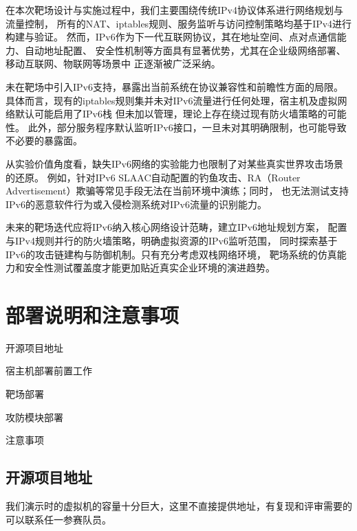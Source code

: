 \documentclass[lang=cn,10pt]{elegantbook}
\begin{document}
在本次靶场设计与实施过程中，我们主要围绕传统IPv4协议体系进行网络规划与流量控制，
所有的NAT、iptables规则、服务监听与访问控制策略均基于IPv4进行构建与验证。
然而，IPv6作为下一代互联网协议，其在地址空间、点对点通信能力、自动地址配置、
安全性机制等方面具有显著优势，尤其在企业级网络部署、移动互联网、物联网等场景中
正逐渐被广泛采纳。

未在靶场中引入IPv6支持，暴露出当前系统在协议兼容性和前瞻性方面的局限。
具体而言，现有的iptables规则集并未对IPv6流量进行任何处理，宿主机及虚拟网络默认可能启用了IPv6栈
但未加以管理，理论上存在绕过现有防火墙策略的可能性。
此外，部分服务程序默认监听IPv6接口，一旦未对其明确限制，也可能导致不必要的暴露面。

从实验价值角度看，缺失IPv6网络的实验能力也限制了对某些真实世界攻击场景的还原。
例如，针对IPv6 SLAAC自动配置的钓鱼攻击、RA（Router Advertisement）欺骗等常见手段无法在当前环境中演练；同时，
也无法测试支持IPv6的恶意软件行为或入侵检测系统对IPv6流量的识别能力。

未来的靶场迭代应将IPv6纳入核心网络设计范畴，建立IPv6地址规划方案，
配置与IPv4规则并行的防火墙策略，明确虚拟资源的IPv6监听范围，
同时探索基于IPv6的攻击链建构与防御机制。只有充分考虑双栈网络环境，
靶场系统的仿真能力和安全性测试覆盖度才能更加贴近真实企业环境的演进趋势。

\subsection{}


\chapter{部署说明和注意事项}

\begin{introduction}
    \item 开源项目地址
    \item 宿主机部署前置工作
    \item 靶场部署
    \item 攻防模块部署
    \item 注意事项
\end{introduction}

\section{开源项目地址}

我们演示时的虚拟机的容量十分巨大，这里不直接提供地址，有复现和评审需要的可以联系任一参赛队员。
\end{document}
